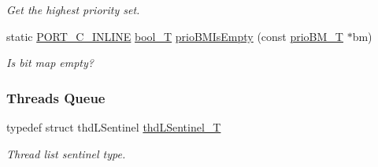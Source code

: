 \begin{DoxyCompactItemize}
\begin{DoxyCompactList}\small\item\em Get the highest priority set. \end{DoxyCompactList}\item 
static \hyperlink{group__template__compiler_ga87952d6e574c7f437503926e833ba345}{P\-O\-R\-T\-\_\-\-C\-\_\-\-I\-N\-L\-I\-N\-E} \hyperlink{group__template__compiler_ga74fbee312f9185efb602f89d21b53404}{bool\-\_\-\-T} \hyperlink{group__kern__impl_gacf4e2945165e95247a4dbaf740f575ed}{prio\-B\-M\-Is\-Empty} (const \hyperlink{group__kern__impl_gacd0176b76efe8eb30f7f4f3928afe256}{prio\-B\-M\-\_\-\-T} $\ast$bm)
\begin{DoxyCompactList}\small\item\em Is bit map empty? \end{DoxyCompactList}\end{DoxyCompactItemize}
\subsubsection*{Threads Queue}
\begin{DoxyCompactItemize}
\item 
typedef struct thd\-L\-Sentinel \hyperlink{group__kern__impl_ga4806631fb32fcff150e92b2172f870b8}{thd\-L\-Sentinel\-\_\-\-T}
\begin{DoxyCompactList}\small\item\em Thread list sentinel type. \end{DoxyCompactList}\end{DoxyCompactItemize}
